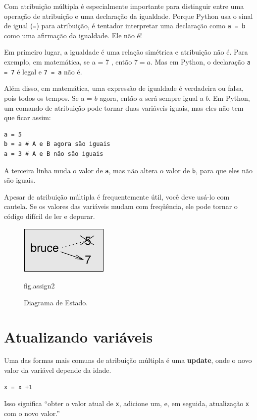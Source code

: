 \documentclass[10pt]{book}
\begin{document}
\begin{exercise}
{{Com atribuição múltipla é especialmente importante para distinguir
entre uma operação de atribuição e uma declaração da igualdade. Porque
Python usa o sinal de igual ({\tt =}) para atribuição, é tentador
interpretar uma declaração como {\tt a = b} como uma afirmação da igualdade. Ele
não é!

Em primeiro lugar, a igualdade é uma relação simétrica e atribuição não é. Para
exemplo, em matemática, se a = 7 $ $, então $ 7 = a $. Mas em Python, o
declaração {\tt a = 7} é legal e {\tt 7 = a} não é.

Além disso, em matemática, uma expressão de igualdade é verdadeira ou
falsa, pois todos os tempos. Se a = $ b $ agora, então $ a $ será sempre igual a $ b $.
Em Python, um comando de atribuição pode tornar duas variáveis ​​iguais, mas
eles não tem que ficar assim:

\begin{verbatim}
a = 5
b = a # A e B agora são iguais
a = 3 # A e B não são iguais
\end{verbatim}
%
A terceira linha muda o valor de {\tt a}, mas não altera o
valor de {\tt b}, para que eles não são iguais. 

Apesar de atribuição múltipla é frequentemente útil, você deve usá-lo
com cautela. Se os valores das variáveis ​​mudam com freqüência, ele pode
tornar o código difícil de ler e depurar.

\begin{figure}
\centerline
{\includegraphics[scale = 0.8] {figs/assign2.pdf}}
\caption{Diagrama de Estado.}
\label{} fig.assign2
\end{figure}



\section{Atualizando variáveis}
\label{update}


Uma das formas mais comuns de atribuição múltipla é uma {\bf update},
onde o novo valor da variável depende da idade.

\begin{verbatim}
x = x +1
\end{verbatim}
%
Isso significa ``obter o valor atual de {\tt x}, adicione um, e, em seguida,
atualização {\tt x} com o novo valor.''

}}
\end{exercise}
\end{document}
